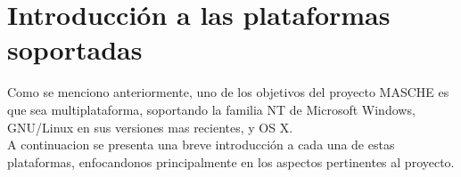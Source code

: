 \section{Introducción a las plataformas soportadas}

Como se menciono anteriormente, uno de los objetivos del proyecto MASCHE es que sea multiplataforma, soportando la familia NT de Microsoft Windows, GNU/Linux en sus versiones mas recientes, y OS X.\\

A continuacion se presenta una breve introducción a cada una de estas plataformas, enfocandonos principalmente en los aspectos pertinentes al proyecto.\\

